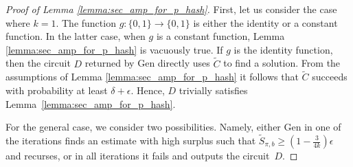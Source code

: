 %
%
\begin{proof}[Proof of Lemma \ref{lemma:sec_amp_for_p_hash}]
First, let us consider the case where $k=1$. The function $g: \{0,1\} \rightarrow \{0,1\}$ is either the identity or a constant function.
In the latter case, when $g$ is a constant function, Lemma \ref{lemma:sec_amp_for_p_hash} is vacuously true.
If $g$ is the identity function, then the circuit $D$ returned by Gen directly uses $\widetilde{C}$ to find a solution.
From the assumptions of Lemma \ref{lemma:sec_amp_for_p_hash} it follows that $\widetilde{C}$ succeeds with probability at least
$\delta + \epsilon$. Hence, $D$ trivially satisfies Lemma~\ref{lemma:sec_amp_for_p_hash}.

For the general case, we consider two possibilities.
Namely, either Gen in one of the iterations finds an estimate with high surplus such that $\widetilde{S}_{\pi, b} \geq (1-\frac{3}{4k})\epsilon$ and recurses,
or in all iterations it fails and outputs the circuit~$D$.


\end{proof}
